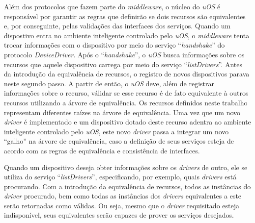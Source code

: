 Além dos protocolos que fazem parte do \emph{middleware}, o núcleo do \emph{uOS} é responsável por garantir as regras que definirão se dois recursos são equivalentes e, por conseguinte, pelas validações das interfaces dos serviços. Quando um dispostivo entra no ambiente inteligente controlado pelo \emph{uOS}, o \emph{middleware} tenta trocar informações com o dispositivo por meio do serviço ``\emph{handshake}'' do protocolo \emph{DeviceDriver}. Após o ``\emph{handshake}'', o \emph{uOS} busca informações sobre os recursos que aquele dispositivo carrega por meio do serviço ``\emph{listDrivers}''. Antes da introdução da equivalência de recursos, o registro de novos dispositivos parava neste segundo passo. A partir de então, o \emph{uOS} deve, além de registrar informações sobre o recurso, válidar se esse recurso é de fato equivalente à outros recursos utilizando a árvore de equivalência. Os recursos definidos neste trabalho representam diferentes raízes na árvore de equivalência. Uma vez que um novo \emph{driver} é implementado e um dispositivo dotado deste recurso adentra ao ambiente inteligente controlado pelo \emph{uOS}, este novo \emph{driver} passa a integrar um novo ``galho'' na árvore de equivalência, caso a definição de seus serviços esteja de acordo com as regras de equivalência e consistência de interfaces.

Quando um dispositivo deseja obter informações sobre os \emph{drivers} de outro, ele se utiliza do serviço ``\emph{listDrivers}'', especificando, por exemplo, quais \emph{drivers} está procurando. Com a introdução da equivalência de recursos, todos as instâncias do \emph{driver} procurado, bem como todas as instâncias dos \emph{drivers} equivalentes a este serão retornadas como válidas. Ou seja, mesmo que o \emph{driver} requisitado esteja indisponível, seus equivalentes serão capazes de prover os serviços desejados.
